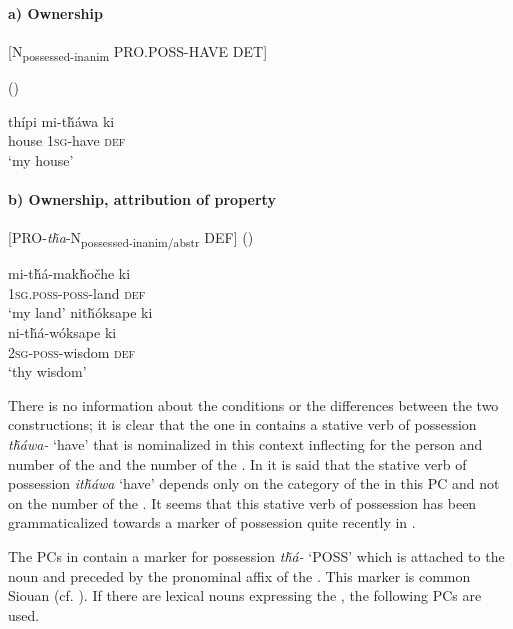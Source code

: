 \documentclass[output=paper]{LSP/langsci}
\begin{document}
\paragraph*{a)	Ownership}

[N\textsubscript{possessed-inanim} PRO.POSS-HAVE DET]
\vspace{1em}

\ea {} (\citealt[98]{Buechel1939}) \label{lakotahouse}

\gll thípi     mi-t\v{h}áwa ki \\
house \textsc{1sg}-have  \textsc{def} \\
\glt `my house'
\z

\newpage
\paragraph*{b) Ownership, attribution of property}

[PRO-\textit{t\v{h}a}-N\textsubscript{possessed-inanim/abstr} DEF]
\vspace{1em}
\ea {} (\citealt[98]{Buechel1939}) \label{lakotalandwisdom}

\ea \gll mi-t\v{h}á-mak\v{h}o\v{c}he   ki \\
\textsc{1sg.poss-poss}-land   \textsc{def} \\
\glt `my land'
\ex  
\glll nit\v{h}óksape ki \\
 ni-t\v{h}á-wóksape   ki \\
\textsc{2sg-poss}-wisdom  \textsc{def} \\
\glt `thy wisdom'
\z \z

There is no information about the conditions or the differences between the two constructions; it is clear that the one in  contains a stative verb of possession \textit{t\v{h}áwa-} `have' that is nominalized in this context inflecting for the person and number of the  and the number of the . In \citet[458]{RoodTaylor1996} it is said that the stative verb of possession \textit{it\v{h}áwa} `have' depends only on the category of the  in this PC and not on the number of the . It seems that this stative verb of possession has been grammaticalized towards a marker of possession quite recently in . 

The PCs in  contain a marker for possession \textit{t\v{h}á-} `POSS' which is attached to the  noun and preceded by the pronominal affix of the . This marker is common Siouan (cf. \citealt{RankinEtAl2015AccessMay}). If there are lexical nouns expressing the , the following PCs are used.
\end{document}
